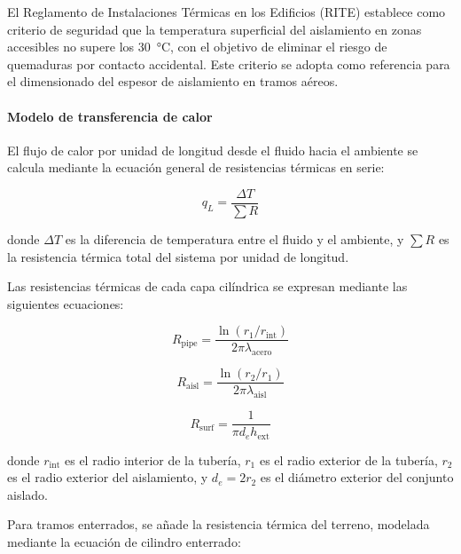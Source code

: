 \documentclass[12pt]{article}
\begin{document}
El Reglamento de Instalaciones Térmicas en los Edificios (RITE) \cite{RITE2007} establece como criterio de seguridad que la temperatura superficial del aislamiento en zonas accesibles no supere los 30~°C, con el objetivo de eliminar el riesgo de quemaduras por contacto accidental. Este criterio se adopta como referencia para el dimensionado del espesor de aislamiento en tramos aéreos.

\paragraph{Modelo de transferencia de calor}
\label{par:modelo_transferencia}

El flujo de calor por unidad de longitud desde el fluido hacia el ambiente se calcula mediante la ecuación general de resistencias térmicas en serie:

\begin{equation}
	q_L = \frac{\Delta T}{\sum R}
	\label{eq:perdida_lineal_aisl}
\end{equation}

\noindent donde $\Delta T$ es la diferencia de temperatura entre el fluido y el ambiente, y $\sum R$ es la resistencia térmica total del sistema por unidad de longitud.

Las resistencias térmicas de cada capa cilíndrica se expresan mediante las siguientes ecuaciones:

\begin{equation}
	R_{\text{pipe}} = \frac{\ln(r_1 / r_{\text{int}})}{2\pi \lambda_{\text{acero}}}
	\label{eq:resist_tuberia}
\end{equation}

\begin{equation}
	R_{\text{aisl}} = \frac{\ln(r_2 / r_1)}{2\pi \lambda_{\text{aisl}}}
	\label{eq:resist_aislamiento}
\end{equation}

\begin{equation}
	R_{\text{surf}} = \frac{1}{\pi d_e h_{\text{ext}}}
	\label{eq:resist_superficie}
\end{equation}

\noindent donde $r_{\text{int}}$ es el radio interior de la tubería, $r_1$ es el radio exterior de la tubería, $r_2$ es el radio exterior del aislamiento, y $d_e = 2r_2$ es el diámetro exterior del conjunto aislado.

Para tramos enterrados, se añade la resistencia térmica del terreno, modelada mediante la ecuación de cilindro enterrado:
\end{document}

